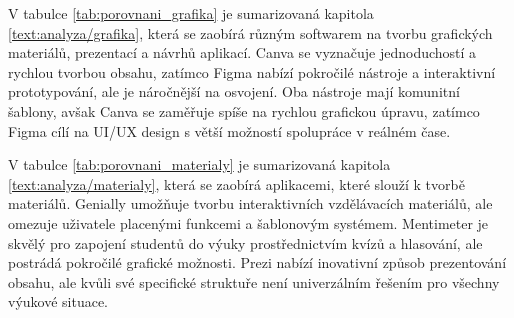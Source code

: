 V tabulce \ref{tab:porovnani_grafika} je sumarizovaná kapitola \ref{text:analyza/grafika}, která se zaobírá různým softwarem na tvorbu grafických materiálů, prezentací a návrhů aplikací.
Canva se vyznačuje jednoduchostí a rychlou tvorbou obsahu, zatímco Figma nabízí pokročilé nástroje a interaktivní prototypování, ale je náročnější na osvojení. Oba nástroje mají komunitní šablony, avšak Canva se zaměřuje spíše na rychlou grafickou úpravu, zatímco Figma cílí na UI/UX design s větší možností spolupráce v reálném čase.


\begin{table}[h!]
    \centering
    \caption{Porovnání aplikací na grafickou tvorbu}
    \label{tab:porovnani_grafika}
\end{table}

V tabulce \ref{tab:porovnani_materialy} je sumarizovaná kapitola \ref{text:analyza/materialy}, která se zaobírá aplikacemi, které slouží k tvorbě materiálů.
Genially umožňuje tvorbu interaktivních vzdělávacích materiálů, ale omezuje uživatele placenými funkcemi a šablonovým systémem. Mentimeter je skvělý pro zapojení studentů do výuky prostřednictvím kvízů a hlasování, ale postrádá pokročilé grafické možnosti. Prezi nabízí inovativní způsob prezentování obsahu, ale kvůli své specifické struktuře není univerzálním řešením pro všechny výukové situace.



